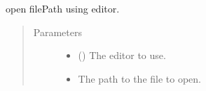 \documentclass[a4paper,10pt,english]{sphinxmanual}
\begin{document}
\begin{fulllineitems}
\label{\detokenize{commands/apidoc/src:src.system.show_in_editor}}
open filePath using editor.
\begin{quote}\begin{description}
\item[{Parameters}] \leavevmode\begin{itemize}
\item {} 
 () \textendash{} The editor to use.

\item {} 
 \textendash{} The path to the file to open.

\end{itemize}

\end{description}\end{quote}

\end{fulllineitems}

\end{document}
